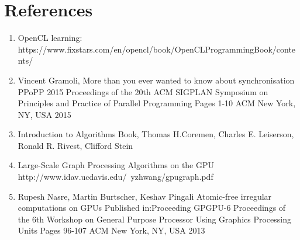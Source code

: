 \documentclass[BTech]{iitmdiss}
\begin{document}
\section{References}
\begin{enumerate}  
\item OpenCL learning: \newblock\\
https://www.fixstars.com/en/opencl/book/OpenCLProgrammingBook/contents/
\item Vincent Gramoli, More than you ever wanted to know about synchronisation\\
PPoPP 2015 Proceedings of the 20th ACM SIGPLAN Symposium on Principles and Practice of Parallel Programming
Pages 1-10 
ACM New York, NY, USA 2015 
\item Introduction to Algorithms Book, Thomas H.Coremen, Charles E. Leiserson, Ronald R. Rivest, Clifford Stein
\item Large-Scale Graph Processing Algorithms on the GPU\\
http://www.idav.ucdavis.edu/~yzhwang/gpugraph.pdf
\item Rupesh Nasre, Martin Burtscher, Keshav Pingali Atomic-free irregular computations on GPUs
Published in:Proceeding
GPGPU-6 Proceedings of the 6th Workshop on General Purpose Processor Using Graphics Processing Units
Pages 96-107 
ACM New York, NY, USA 2013 
\end{enumerate}

\appendix
\lstset{style=mystyle}
\end{document}
